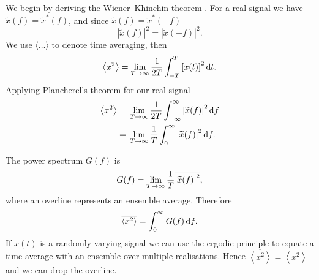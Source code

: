We begin by deriving the Wiener--Khinchin theorem \citep[chapter 28]{Kittel1958}. For a real signal we have $\widetilde{x}(f) = \widetilde{x}^\ast(f)$, and since $\widetilde{x}(f) = \widetilde{x}^\ast(-f)$
\begin{equation}
\left|\widetilde{x}(f)\right|^2 = \left|\widetilde{x}(-f)\right|^2.
\end{equation}
We use $\langle\ldots\rangle$ to denote time averaging, then
\begin{equation}
\left\langle x^2\right\rangle = \lim_{T \rightarrow \infty} \frac{1}{2T} \int_{-T}^{T}{\left[x(t)\right]^2}\,\mathrm{d}{t}.
\end{equation}
Applying Plancherel's theorem for our real signal
\begin{align}
\left\langle x^2\right\rangle = {} & \lim_{T \rightarrow \infty} \frac{1}{2T} \int_{-\infty}^{\infty}{\left|\widetilde{x}(f)\right|^2}\,\mathrm{d}{f} \nonumber \\
 = {} & \lim_{T \rightarrow \infty} \frac{1}{T} \int_{0}^{\infty}{\left|\widetilde{x}(f)\right|^2}\,\mathrm{d}{f}.
\end{align}

The power spectrum $G(f)$ is
\begin{equation}
G(f) = \lim_{T \rightarrow \infty} \frac{1}{T} \overline{\left|\widetilde{x}(f)\right|^2},
\end{equation}
where an overline represents an ensemble average. Therefore
\begin{equation}
\overline{\left\langle x^2\right\rangle} = \int_{0}^{\infty}{G(f)}\,\mathrm{d}{f}.
\end{equation}
If $x(t)$ is a randomly varying signal we can use the ergodic principle to equate a time average with an ensemble over multiple realisations. Hence $\overline{\left\langle x^2\right\rangle} = \left\langle x^2\right\rangle$ and we can drop the overline.

